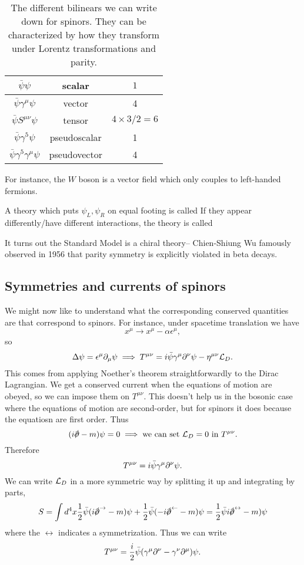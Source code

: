 \begin{table}[]
    \centering
    \begin{tabular}{|c|c|c|}
        \hline
         $\bar\psi \psi$ & scalar & $1$\\ \hline
         $\bar \psi \gamma^\mu \psi$ & vector & 4\\ \hline
         $\bar \psi S^{\mu\nu}\psi$ & tensor & $4\times 3/2=6$\\ \hline
         $\bar \psi \gamma^5 \psi$ & pseudoscalar & 1\\ \hline
         $\bar \psi \gamma^5 \gamma^\mu \psi$ & pseudovector & 4\\ \hline
    \end{tabular}
    \caption{The different bilinears we can write down for spinors. They can be characterized by how they transform under Lorentz transformations and parity.}
    \label{tab:bilinears}
\end{table}

For instance, the $W$ boson is a vector field which only couples to left-handed fermions. 
\begin{defn}
A theory which puts $\psi_L,\psi_R$ on equal footing is called  If they appear differently/have different interactions, the theory is called 

It turns out the Standard Model is a chiral theory-- Chien-Shiung Wu famously observed in 1956 that parity symmetry is explicitly violated in beta decays.
\end{defn}

\subsection*{Symmetries and currents of spinors} We might now like to understand what the corresponding conserved quantities are that correspond to spinors. For instance, under spacetime translation we have
$$x^\mu \to x^\mu -\alpha \epsilon^\mu,$$
so
$$\Delta \psi=\epsilon^\mu \partial_\mu \psi \implies T^{\mu\nu}=i \bar \psi \gamma^\mu \partial^\nu \psi-\eta^{\mu\nu}\mathcal L_D.$$
This comes from applying Noether's theorem straightforwardly to the Dirac Lagrangian.
We get a conserved current when the equations of motion are obeyed, so we can impose them on $T^{\mu\nu}$. This doesn't help us in the bosonic case where the equations of motion are second-order, but for spinors it does because the equatiosn are first order. Thus
$$(i\slashed{\p}-m)\psi=0 \implies \text{we can set }\cL_D=0\text{ in }T^{\mu\nu}.$$
Therefore
$$T^{\mu\nu}=i\bar \psi \gamma^\mu \partial^\nu \psi.$$
We can write $\mathcal L_D$ in a more symmetric way by splitting it up and integrating by parts,
$$S=\int d^4x \frac{1}{2} \bar \psi(i \slashed{\p}^\rightarrow -m)\psi+\frac{1}{2}\bar \psi(-i \slashed{\p}^\leftarrow - m)\psi = \frac{1}{2} \bar \psi i \slashed{\p}^\leftrightarrow - m)\psi$$
where the $\leftrightarrow$ indicates a symmetrization. Thus we can write
$$T^{\mu\nu}=\frac{i}{2}\bar\psi (\gamma^\mu \partial^\nu- \gamma^\nu \partial^\mu)\psi.$$